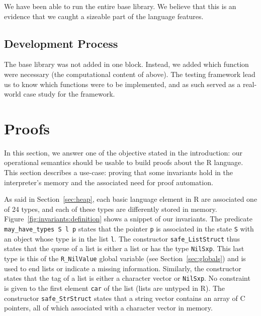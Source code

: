\documentclass[
    sigplan,
    10pt,
    review, %
    natbib=false %
 ]{acmart}
\begin{document}
We have been able to run the entire base library.
We believe that this is an evidence that we caught a sizeable
part of the language features.

\subsection{Development Process}
\label{sec:library:development}

\todo{}

The base library was not added in one block.
Instead, we added which function were necessary
(the computational content of above).
The testing framework lead us to know which functions were to be implemented,
and as such served as a real-world case study for the framework.


\section{Proofs}
\label{sec:proofs}

In this section,
we answer one of the objective stated in the introduction:
our operational semantics should be usable to build proofs about the R language.
This section describes a use-case:
proving that some invariants hold in the interpreter's memory
and the associated need for proof automation.

As said in Section~\ref{sec:heap},
each basic language element in R are associated one of 24 types,
and each of these types are differently stored in memory.
Figure~\ref{fig:invariants:definition} shows a snippet
of our invariants.
%
The predicate \texttt{may_have_types S l p}
states that the pointer \texttt{p}
is associated in the state \texttt{S} with an object
whose type is in the list \texttt{l}.
%
The constructor \texttt{safe_ListStruct}
thus states that the queue of a list is either a list
or has the type \texttt{NilSxp}.
This last type is this of the \texttt{R_NilValue}
global variable (see Section~\ref{sec:globals})
and is used to end lists or indicate a missing information.
Similarly, the constructor states that the tag
of a list is either a character vector or \texttt{NilSxp}.
No constraint is given to the first element \texttt{car}
of the list (lists are untyped in R).
%
The constructor \texttt{safe_StrStruct} states that
a string vector contains an array of C pointers,
all of which associated with a character vector in memory.
\end{document}

